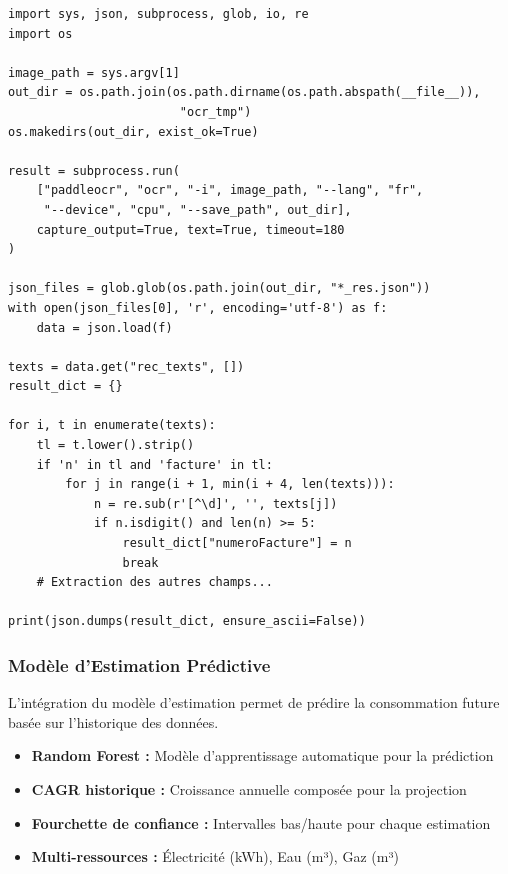 \documentclass[12pt,a4paper]{article}
\begin{document}
\begin{lstlisting}[caption=Script OCR PaddleOCR pour factures STEG]
import sys, json, subprocess, glob, io, re
import os

image_path = sys.argv[1]
out_dir = os.path.join(os.path.dirname(os.path.abspath(__file__)),
                        "ocr_tmp")
os.makedirs(out_dir, exist_ok=True)

result = subprocess.run(
    ["paddleocr", "ocr", "-i", image_path, "--lang", "fr",
     "--device", "cpu", "--save_path", out_dir],
    capture_output=True, text=True, timeout=180
)

json_files = glob.glob(os.path.join(out_dir, "*_res.json"))
with open(json_files[0], 'r', encoding='utf-8') as f:
    data = json.load(f)

texts = data.get("rec_texts", [])
result_dict = {}

for i, t in enumerate(texts):
    tl = t.lower().strip()
    if 'n' in tl and 'facture' in tl:
        for j in range(i + 1, min(i + 4, len(texts))):
            n = re.sub(r'[^\d]', '', texts[j])
            if n.isdigit() and len(n) >= 5:
                result_dict["numeroFacture"] = n
                break
    # Extraction des autres champs...

print(json.dumps(result_dict, ensure_ascii=False))
\end{lstlisting}

\subsubsection{Modèle d'Estimation Prédictive}
L'intégration du modèle d'estimation permet de prédire la consommation future basée sur l'historique des données.

\begin{itemize}
    \item \textbf{Random Forest :} Modèle d'apprentissage automatique pour la prédiction
    \item \textbf{CAGR historique :} Croissance annuelle composée pour la projection
    \item \textbf{Fourchette de confiance :} Intervalles bas/haute pour chaque estimation
    \item \textbf{Multi-ressources :} Électricité (kWh), Eau (m³), Gaz (m³)
\end{itemize}
\end{document}
